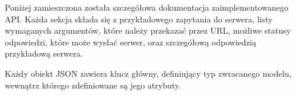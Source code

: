 Poniżej zamieszczona została szczegółowa dokumentacja zaimplementowanego API. Każda sekcja składa się z przykładowego zapytania do serwera, listy wymaganych argumentów, które należy przekazać przez URL, możliwe statusy odpowiedzi, które może wysłać serwer, oraz szczegółową odpowiedzią przykładową serwera.

Każdy obiekt JSON zawiera klucz główny, definiujący typ zwracanego modelu, wewnątrz którego zdefiniowane są jego atrybuty.
